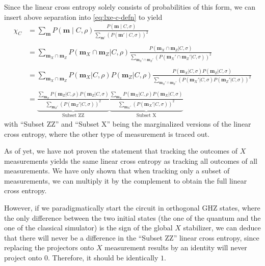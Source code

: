 Since the linear cross entropy solely consists of probabilities of this form,
we can insert above separation into \cref{eq:lxe-c-defn} to yield
\begin{align}
      \label{eq:lxe-subset}
      \chi_C &= \sum_{\mathbf{m}} P(\mathbf{m} \mid C, \rho) \frac{P(\mathbf{m} \mid
      C, \sigma)}{\sum_{\mathbf{m}'}\left(P(\mathbf{m}' \mid
      C, \sigma)\right)^2} \nonumber\\
      \nonumber\\
      &= \sum_{\mathbf{m}_X \cap \mathbf{m}_Z} P(\mathbf{m}_X \cap \mathbf{m}_Z |
        C, \rho) \frac{P(\mathbf{m}_X \cap \mathbf{m}_Z| C,
        \sigma)}{\sum_{\mathbf{m}_X' \cap \mathbf{m}_Z'} \left(P(\mathbf{m}_X' \cap
        \mathbf{m}_Z'|C,\sigma)\right)^2}\nonumber\\
        \nonumber\\
      &= \sum_{\mathbf{m}_X \cap \mathbf{m}_Z} P(\mathbf{m}_X | C, \rho) P(
        \mathbf{m}_Z | C, \rho) \frac{P(\mathbf{m}_X | C, \sigma) P( \mathbf{m}_Z|
        C, \sigma)}{\sum_{\mathbf{m}_X' \cap \mathbf{m}_Z'}
          \left(P(\mathbf{m}_X' | C,
        \sigma) P( \mathbf{m}_Z'|C,\sigma)\right)^2}\nonumber\\
        \nonumber\\
      &= \underbrace{\frac{\sum_{\mathbf{m}_Z} P(\mathbf{m}_Z | C, \rho)
          P(\mathbf{m}_Z | C, \sigma)}{\sum_{\mathbf{m}_Z'}
          \left(P(\mathbf{m}_Z' |
          C, \sigma)\right)^2}}_{\text{Subset ZZ}}
          \underbrace{\frac{\sum_{\mathbf{m}_X} P(\mathbf{m}_X | C, \rho)
          P(\mathbf{m}_X | C, \sigma)}{\sum_{\mathbf{m}_X'}
          \left(P(\mathbf{m}_X' |
          C, \sigma)\right)^2}}_{\text{Subset X}}
\end{align}
with \enquote{Subset ZZ} and \enquote{Subset X} being the marginalized versions
of the linear cross entropy, where the other type of measurement is traced out.

As of yet, we have not proven the statement that tracking the outcomes of $X$
measurements yields the same linear cross entropy as tracking all outcomes of
all measurements. We have only shown that when tracking only a subset of
measurements, we can multiply it by the complement to obtain the full linear
cross entropy.

However, if we paradigmatically start the circuit in orthogonal GHZ states,
where the only difference between the two initial states (the one of the
quantum and the one of the classical simulator) is the sign of the global $X$
stabilizer, we can deduce that there will never be a difference in the
\enquote{Subset ZZ} linear cross entropy, since replacing the projectors onto
$X$ measurement results by an identity will never project onto $0$. Therefore,
it should be identically $1$.

